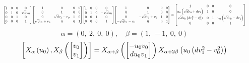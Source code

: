 \documentclass[11pt]{article}
\theoremstyle{definition}
\begin{document}
\[
\scaletoalign{\textwidth}{{\left[\begin{matrix}1 & 0 & 0 & 0\\0 & 1 & 0 & \sqrt{d} u_{0}\\0 & 0 & 1 & 0\\0 & 0 & 0 & 1\end{matrix}\right]} {\left[\begin{matrix}1 & 0 & 0 & 0\\0 & 1 & 0 & 0\\0 & \sqrt{d} v_{1} - v_{0} & 1 & 0\\\sqrt{d} v_{1} + v_{0} & 0 & 0 & 1\end{matrix}\right]} {\left[\begin{matrix}1 & 0 & 0 & 0\\0 & 1 & 0 & - \sqrt{d} u_{0}\\0 & 0 & 1 & 0\\0 & 0 & 0 & 1\end{matrix}\right]} {\left[\begin{matrix}1 & 0 & 0 & 0\\0 & 1 & 0 & 0\\0 & - \sqrt{d} v_{1} + v_{0} & 1 & 0\\- \sqrt{d} v_{1} - v_{0} & 0 & 0 & 1\end{matrix}\right]} = {\left[\begin{matrix}1 & 0 & 0 & 0\\u_{0} \left(\sqrt{d} v_{0} + d v_{1}\right) & 1 & 0 & 0\\\sqrt{d} u_{0} \left(d v_{1}^{2} - v_{0}^{2}\right) & 0 & 1 & u_{0} \left(\sqrt{d} v_{0} - d v_{1}\right)\\0 & 0 & 0 & 1\end{matrix}\right]}}
\]
\[
\alpha = \left( 0, \  2, \  0, \  0\right), \quad \beta = \left( 1, \  -1, \  0, \  0\right)
\]
\[
\scaletoalign{\textwidth}{\left[ X_{\alpha}\left(u_{0}\right), X_{\beta}\left(\left[\begin{matrix}v_{0}\\v_{1}\end{matrix}\right]\right) \right] = X_{\alpha + \beta}\left(\left[\begin{matrix}- u_{0} v_{0}\\d u_{0} v_{1}\end{matrix}\right]\right) X_{\alpha + 2\beta}\left(u_{0} \left(d v_{1}^{2} - v_{0}^{2}\right)\right)}
\]
\end{document}
